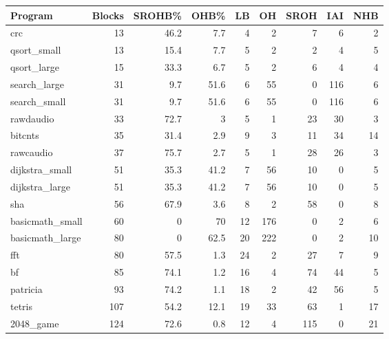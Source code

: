 \begin{tabular}{|l|r|r|r|r|r|r|r|r|}
\hline
 Program         &   Blocks &   SROHB\% &   OHB\% &   LB &   OH &   SROH &   IAI &   NHB \\
\hline
 crc             &       13 &     46.2 &    7.7 &    4 &    2 &      7 &     6 &     2 \\
\hline
 qsort\_small     &       13 &     15.4 &    7.7 &    5 &    2 &      2 &     4 &     5 \\
\hline
 qsort\_large     &       15 &     33.3 &    6.7 &    5 &    2 &      6 &     4 &     4 \\
\hline
 search\_large    &       31 &      9.7 &   51.6 &    6 &   55 &      0 &   116 &     6 \\
\hline
 search\_small    &       31 &      9.7 &   51.6 &    6 &   55 &      0 &   116 &     6 \\
\hline
 rawdaudio       &       33 &     72.7 &    3   &    5 &    1 &     23 &    30 &     3 \\
\hline
 bitcnts         &       35 &     31.4 &    2.9 &    9 &    3 &     11 &    34 &    14 \\
\hline
 rawcaudio       &       37 &     75.7 &    2.7 &    5 &    1 &     28 &    26 &     3 \\
\hline
 dijkstra\_small  &       51 &     35.3 &   41.2 &    7 &   56 &     10 &     0 &     5 \\
\hline
 dijkstra\_large  &       51 &     35.3 &   41.2 &    7 &   56 &     10 &     0 &     5 \\
\hline
 sha             &       56 &     67.9 &    3.6 &    8 &    2 &     58 &     0 &     8 \\
\hline
 basicmath\_small &       60 &      0   &   70   &   12 &  176 &      0 &     2 &     6 \\
\hline
 basicmath\_large &       80 &      0   &   62.5 &   20 &  222 &      0 &     2 &    10 \\
\hline
 fft             &       80 &     57.5 &    1.3 &   24 &    2 &     27 &     7 &     9 \\
\hline
 bf              &       85 &     74.1 &    1.2 &   16 &    4 &     74 &    44 &     5 \\
\hline
 patricia        &       93 &     74.2 &    1.1 &   18 &    2 &     42 &    56 &     5 \\
\hline
 tetris          &      107 &     54.2 &   12.1 &   19 &   33 &     63 &     1 &    17 \\
\hline
 2048\_game       &      124 &     72.6 &    0.8 &   12 &    4 &    115 &     0 &    21 \\

\end{tabular}
